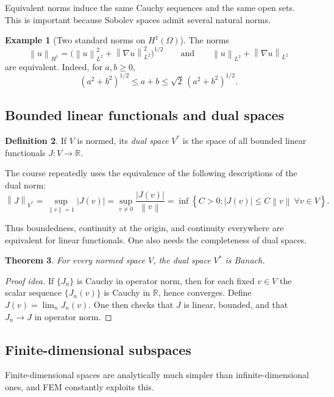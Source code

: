 \documentclass[11pt]{article}
\newtheorem{theorem}{Theorem}[section]
\theoremstyle{definition}
\newtheorem{definition}[theorem]{Definition}
\newtheorem{example}[theorem]{Example}
\newcommand{\R}{\mathbb{R}}
\newcommand{\grad}{\nabla}
\newcommand{\norm}[1]{\left\lVert #1\right\rVert}
\newcommand{\abs}[1]{\left\lvert #1\right\rvert}
\newcommand{\set}[1]{\left\{ #1\right\}}
\begin{document}
Equivalent norms induce the same Cauchy sequences and the same open sets. This is important because Sobolev spaces admit several natural norms.

\begin{example}[Two standard norms on $H^1(\Omega)$]
The norms
\[
\norm{u}_{H^1} = \big(\norm{u}_{L^2}^2 + \norm{\grad u}_{L^2}^2\big)^{1/2}
\qquad \text{and} \qquad
\norm{u}_{L^2} + \norm{\grad u}_{L^2}
\]
are equivalent. Indeed, for $a,b\ge 0$,
\[
(a^2+b^2)^{1/2} \le a+b \le \sqrt{2}\,(a^2+b^2)^{1/2}.
\]
\end{example}

\subsection{Bounded linear functionals and dual spaces}

\begin{definition}
If $V$ is normed, its \emph{dual space} $V^*$ is the space of all bounded linear functionals $J:V\to\R$.
\end{definition}

The course repeatedly uses the equivalence of the following descriptions of the dual norm:
\[
\norm{J}_{V^*} = \sup_{\norm{v}=1} \abs{J(v)}
= \sup_{v\neq 0} \frac{\abs{J(v)}}{\norm{v}}
= \inf\set{C>0 : \abs{J(v)}\le C\norm{v}\ \forall v\in V}.
\]

Thus boundedness, continuity at the origin, and continuity everywhere are equivalent for linear functionals. One also needs the completeness of dual spaces.

\begin{theorem}
For every normed space $V$, the dual space $V^*$ is Banach.
\end{theorem}

\begin{proof}[Proof idea]
If $\{J_n\}$ is Cauchy in operator norm, then for each fixed $v\in V$ the scalar sequence $\{J_n(v)\}$ is Cauchy in $\R$, hence converges. Define $J(v)=\lim_n J_n(v)$. One then checks that $J$ is linear, bounded, and that $J_n\to J$ in operator norm.
\end{proof}

\subsection{Finite-dimensional subspaces}

Finite-dimensional spaces are analytically much simpler than infinite-dimensional ones, and FEM constantly exploits this.
\end{document}
